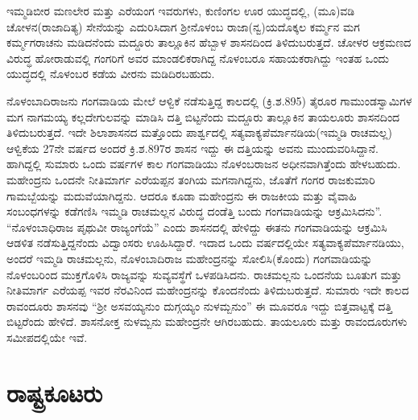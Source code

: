 ಇಮ್ಮಡಿಬೀರ ಮಣಲೇರ ಮತ್ತು ಎರೆಯಂಗ ಇವರುಗಳು, ಕುಣಿಂಗಲ ಊರ ಯುದ್ಧದಲ್ಲಿ, (ಮೂ)ವಡಿ ಚೋಳನ\break (ರಾಜಾದಿತ್ಯ) ಸೇನೆಯನ್ನು ಎದುರಿಸಿದಾಗ ಶ‍್ರೀನೊಳಂಬ ರಾಜಾ(ನ್ವ)ಯದೊಕ್ಕಲ ಕರ್ಮ್ಮನ ಮಗ ಕರ್ಮ್ಮಗರಾಚನು ಮಡಿದನೆಂದು ಮದ್ದೂರು ತಾಲ್ಲೂಕಿನ ಹೆಬ್ಬಾಳ ಶಾಸನದಿಂದ ತಿಳಿದುಬರುತ್ತದೆ. ಚೋಳರ ಆಕ್ರಮಣದ ವಿರುದ್ಧ ಹೋರಾಡುವಲ್ಲಿ ಗಂಗರಿಗೆ ಅವರ ಮಾಂಡಲಿಕರಾಗಿದ್ದ ನೊಳಂಬರೂ ಸಹಾಯಕರಾಗಿದ್ದು ಇಂತಹ ಒಂದು ಯುದ್ಧದಲ್ಲಿ ನೊಳಂಬರ ಕಡೆಯ ವೀರನು ಮಡಿದಿರಬಹುದು.

ನೊಳಂಬಾದಿರಾಜನು ಗಂಗವಾಡಿಯ ಮೇಲೆ ಆಳ್ವಿಕೆ ನಡೆಸುತ್ತಿದ್ದ ಕಾಲದಲ್ಲಿ (ಕ್ರಿ.ಶ.895) ತೈರೂರ ಗಾಮುಂಡಸ್ವಾಮಿ\-ಗಳ ಮಗ ನಾಗಮಯ್ಯ ಕಲ್ಲದೇಗುಲವನ್ನು ಮಾಡಿಸಿ ದತ್ತಿ ಬಿಟ್ಟನೆಂದು ಮದ್ದೂರು ತಾಲ್ಲೂಕಿನ ತಾಯಲೂರು ಶಾಸನದಿಂದ ತಿಳಿದುಬರುತ್ತದೆ. ಇದೇ ಶಿಲಾಶಾಸನದ ಮತ್ತೊಂದು ಪಾರ್ಶ್ವದಲ್ಲಿ ಸತ್ಯವಾಕ್ಯಪೆರ್ಮಾನಡಿಯ(ಇಮ್ಮಡಿ ರಾಚಮಲ್ಲ) ಆಳ್ವಿಕೆಯ 27ನೇ ವರ್ಷದ ಅಂದರೆ ಕ್ರಿ.ಶ.897ರ ಶಾಸನ ಇದ್ದು ಈ ದತ್ತಿಯನ್ನು ಅವನು ಮುಂದುವರಿಸಿದ್ದಾನೆ. ಹಾಗಿದ್ದಲ್ಲಿ ಸುಮಾರು ಒಂದು ವರ್ಷಗಳ ಕಾಲ ಗಂಗವಾಡಿಯು ನೊಳಂಬರಾಜನ ಅಧೀನವಾಗಿತ್ತೆಂದು ಹೇಳಬಹುದು. ಮಹೇಂದ್ರನು ಒಂದನೇ ನೀತಿಮಾರ್ಗ ಎರೆಯಪ್ಪನ ತಂಗಿಯ ಮಗನಾಗಿದ್ದನು, ಜೊತೆಗೆ ಗಂಗರ ರಾಜಕುಮಾರಿ ಗಾಮಬ್ಬೆಯನ್ನು ಮದುವೆ\-ಯಾಗಿದ್ದನು. ಆದರೂ ಕೂಡಾ ಮಹೇಂದ್ರನು ಈ ರಾಜಕೀಯ ಮತ್ತು ವೈವಾಹಿ ಸಂಬಂಧಗಳನ್ನು ಕಡೆಗಣಿಸಿ ಇಮ್ಮಡಿ ರಾಚಮಲ್ಲನ ವಿರುದ್ಧ ದಂಡೆತ್ತಿ ಬಂದು ಗಂಗವಾಡಿಯನ್ನು ಆಕ್ರಮಿಸಿದನು”. “ನೊಳಂಬಾಧಿರಾಜ ಪೃಥುವೀ ರಾಜ್ಯಂಗೆಯೆ” ಎಂದು ಶಾಸನದಲ್ಲಿ ಹೇಳಿದ್ದು ಈತನು ಗಂಗವಾಡಿಯನ್ನು ಆಕ್ರಮಿಸಿ ಆಡಳಿತ ನಡೆಸುತ್ತಿದ್ದನೆಂದು ವಿದ್ವಾಂಸರು ಊಹಿಸಿದ್ದಾರೆ. ಇದಾದ ಒಂದು ವರ್ಷದಲ್ಲಿಯೇ ಸತ್ಯವಾಕ್ಯಪೆರ್ಮಾನಡಿಯು, ಅಂದರೆ ಇಮ್ಮಡಿ ರಾಚಮಲ್ಲನು, ನೊಳಂಬಾದಿರಾಜ ಮಹೇಂದ್ರನನ್ನು ಸೋಲಿಸಿ(ಕೊಂದು) ಗಂಗವಾಡಿಯನ್ನು ನೊಳಂಬರಿಂದ ಮುಕ್ತಗೊಳಿಸಿ ರಾಜ್ಯವನ್ನು ಸುವ್ಯವಸ್ಥೆಗೆ ಒಳಪಡಿ\-ಸಿದನು. ರಾಚಮಲ್ಲನು ಒಂದನೆಯ ಬೂತುಗ ಮತ್ತು ನೀತಿಮಾರ್ಗ ಎರೆಯಪ್ಪ ಇವರ ನೆರವಿನಿಂದ ಮಹೇಂದ್ರನನ್ನು ಕೊಂದನೆಂದು ತಿಳಿದುಬರುತ್ತದೆ. ಸುಮಾರು ಇದೇ ಕಾಲದ ರಾವಂದೂರು ಶಾಸನವು “ಶ‍್ರೀ ಅಸವಯ್ಯನುಂ ದುಗ್ಗಯ್ಯಂ ನುಳಮ್ಬನುಂ” ಈ ಮೂವರೂ ಇದ್ದು ಬಿತ್ತವಾಟ್ಟಕ್ಕೆ ದತ್ತಿ ಬಿಟ್ಟರೆಂದು ಹೇಳಿದೆ. ಶಾಸನೋಕ್ತ ನುಳಮ್ಬನು ಮಹೇಂದ್ರನೇ ಆಗಿರಬಹುದು. ತಾಯಲೂರು ಮತ್ತು ರಾವಂದೂರುಗಳು ಸಮೀಪದಲ್ಲಿಯೇ ಇವೆ.


\section*{ರಾಷ್ಟ್ರಕೂಟರು}

